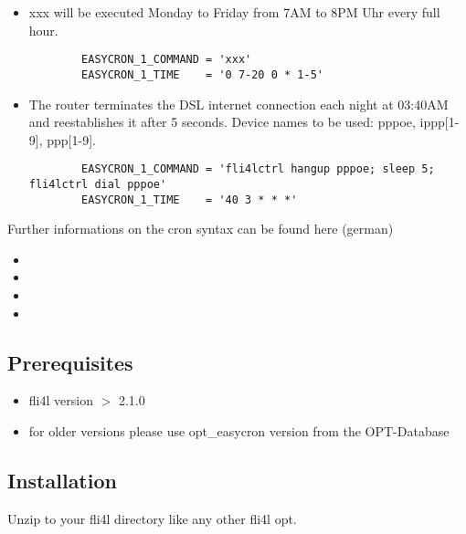 \begin{description}
\begin{itemize}
\item   xxx will be executed Monday to Friday from 7AM to 8PM Uhr every full hour.
\begin{example}
\begin{verbatim}
        EASYCRON_1_COMMAND = 'xxx'
        EASYCRON_1_TIME    = '0 7-20 0 * 1-5'
\end{verbatim}
\end{example}



\item  The router terminates the DSL internet connection each night at 03:40AM
       and reestablishes it after 5 seconds.
       Device names to be used: pppoe, ippp[1-9], ppp[1-9].
\begin{example}
\begin{verbatim}
        EASYCRON_1_COMMAND = 'fli4lctrl hangup pppoe; sleep 5; fli4lctrl dial pppoe'
        EASYCRON_1_TIME    = '40 3 * * *'
\end{verbatim}
\end{example}


\end{itemize}



       Further informations on the cron syntax can be found here (german)
       \begin{itemize}
       \item {} 
       \item {} 
       \item {}
       \item {}
       \end{itemize}





\subsection{Prerequisites}

\begin{itemize}
\item fli4l version $>$ 2.1.0    
\item for older versions please use opt\_easycron version from the OPT-Database
\end{itemize}



\subsection{Installation}

Unzip  to your fli4l directory like any other fli4l opt.


\end{description}
